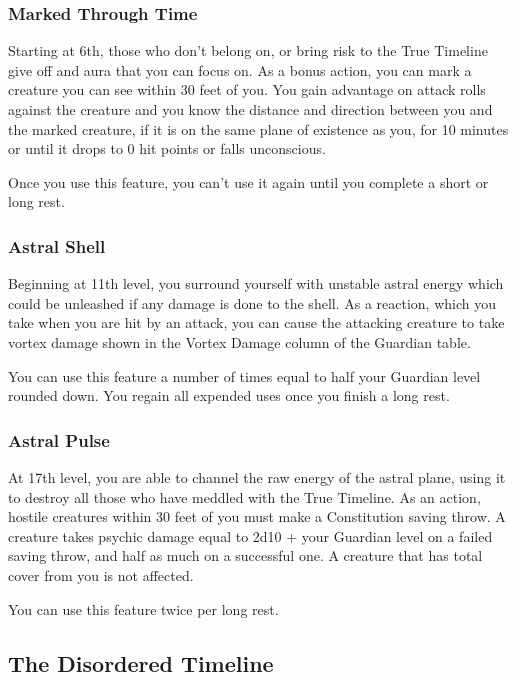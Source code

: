 \subsubsection{Marked Through Time}

Starting at 6th, those who don't belong on, or bring risk to the True Timeline give off and aura that you can focus on. As a bonus action, you can mark a creature you can see within 30 feet of you. You gain advantage on attack rolls against the creature and you know the distance and direction between you and the marked creature, if it is on the same plane of existence as you, for 10 minutes or until it drops to 0 hit points or falls unconscious.

Once you use this feature, you can't use it again until you complete a short or long rest.

\subsubsection{Astral Shell}

Beginning at 11th level, you surround yourself with unstable astral energy which could be unleashed if any damage is done to the shell. As a reaction, which you take when you are hit by an attack, you can cause the attacking creature to take vortex damage shown in the Vortex Damage column of the Guardian table.

You can use this feature a number of times equal to half your Guardian level rounded down. You regain all expended uses once you finish a long rest.

\subsubsection{Astral Pulse}

At 17th level, you are able to channel the raw energy of the astral plane, using it to destroy all those who have meddled with the True Timeline. As an action, hostile creatures within 30 feet of you must make a Constitution saving throw. A creature takes psychic damage equal to 2d10 + your Guardian level on a failed saving throw, and half as much on a successful one. A creature that has total cover from you is not affected.

You can use this feature twice per long rest.

\subsection{The Disordered Timeline}

